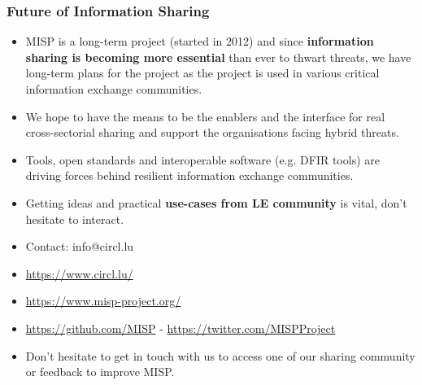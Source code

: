 \begin{frame}
        \frametitle{Future of Information Sharing}
        \begin{itemize}
        \item MISP is a long-term project (started in 2012) and since {\bf information sharing is becoming more essential} than ever to thwart threats, we have long-term plans for the project as the project is used in various critical information exchange communities.
        \item We hope to have the means to be the enablers and the interface for real cross-sectorial sharing and support the organisations facing hybrid threats.
        \item Tools, open standards and interoperable software (e.g. DFIR tools) are driving forces behind resilient information exchange communities.
        \item Getting ideas and practical {\bf use-cases from LE community} is vital, don't hesitate to interact.
        \end{itemize}
\end{frame}


\begin{frame}
\begin{itemize}
\item Contact: info@circl.lu
\item \url{https://www.circl.lu/}
\item \url{https://www.misp-project.org/}
\item \url{https://github.com/MISP} - \url{https://twitter.com/MISPProject}
\item Don't hesitate to get in touch with us to access one of our sharing community or feedback to improve MISP.
\end{itemize}

\end{frame}
